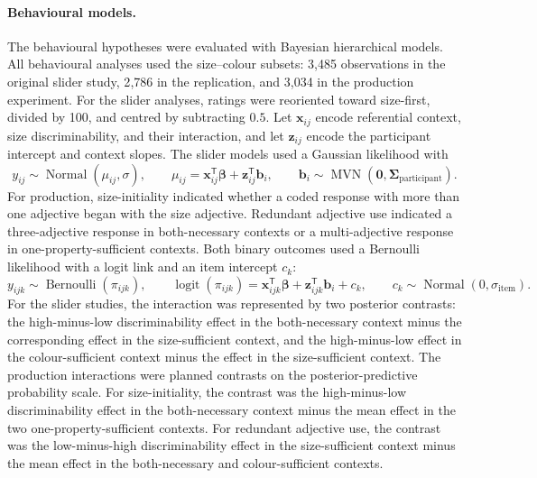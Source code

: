 \documentclass[10pt,a4paper,fleqn]{article}
\begin{document}
\paragraph{Behavioural models.}
The behavioural hypotheses were evaluated with Bayesian hierarchical models.
All behavioural analyses used the size--colour subsets: 3{,}485 observations in the original slider study, 2{,}786 in the replication, and 3{,}034 in the production experiment.
For the slider analyses, ratings were reoriented toward size-first, divided by 100, and centred by subtracting $0.5$.
Let $\mathbf{x}_{ij}$ encode referential context, size discriminability, and their interaction, and let $\mathbf{z}_{ij}$ encode the participant intercept and context slopes.
The slider models used a Gaussian likelihood with
\[
  y_{ij}\sim\operatorname{Normal}(\mu_{ij},\sigma),
  \qquad
  \mu_{ij}=\mathbf{x}_{ij}^{\mathsf T}\boldsymbol\beta+\mathbf{z}_{ij}^{\mathsf T}\mathbf{b}_{i},
  \qquad
  \mathbf{b}_{i}\sim\operatorname{MVN}(\mathbf{0},\boldsymbol\Sigma_{\mathrm{participant}}).
\]
For production, size-initiality indicated whether a coded response with more than one adjective began with the size adjective.
Redundant adjective use indicated a three-adjective response in both-necessary contexts or a multi-adjective response in one-property-sufficient contexts.
Both binary outcomes used a Bernoulli likelihood with a logit link and an item intercept $c_k$:
\[
  y_{ijk}\sim\operatorname{Bernoulli}(\pi_{ijk}),
  \qquad
  \operatorname{logit}(\pi_{ijk})=\mathbf{x}_{ijk}^{\mathsf T}\boldsymbol\beta+\mathbf{z}_{ijk}^{\mathsf T}\mathbf{b}_{i}+c_k,
  \qquad
  c_k\sim\operatorname{Normal}(0,\sigma_{\mathrm{item}}).
\]
For the slider studies, the interaction was represented by two posterior contrasts: the high-minus-low discriminability effect in the both-necessary context minus the corresponding effect in the size-sufficient context, and the high-minus-low effect in the colour-sufficient context minus the effect in the size-sufficient context.
The production interactions were planned contrasts on the posterior-predictive probability scale.
For size-initiality, the contrast was the high-minus-low discriminability effect in the both-necessary context minus the mean effect in the two one-property-sufficient contexts.
For redundant adjective use, the contrast was the low-minus-high discriminability effect in the size-sufficient context minus the mean effect in the both-necessary and colour-sufficient contexts.
\end{document}
